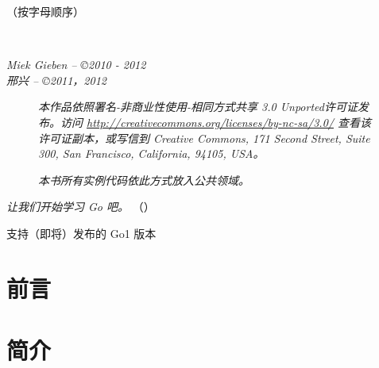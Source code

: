 \documentclass[a4paper,twoside,openleft]{blocksbook}
\begin{document}
\begin{cjk}
\begin{center}
（{\small 按字母顺序}）

\end{center}
\vfill
\begin{center}
    \hspace*{1cm}\\[2.5ex]
    \hspace*{1cm}{\tiny\CcNote{\CcLongnameByNcSa}}
\end{center}
\begin{center}
\hspace*{1cm}\emph{Miek Gieben -- \copyright 2010 - 2012} \\
\hspace*{1cm}\emph{邢兴 -- \copyright 2011，2012}
\end{center}
\vspace{-3em}

\newpage

\thispagestyle{empty}
\begin{figure}[H]
\begin{center}
\emph{
本作品依照署名-非商业性使用-相同方式共享 3.0 Unported许可证发布。访问 \url{http://creativecommons.org/licenses/by-nc-sa/3.0/} 查看该许可证副本，或写信到 Creative Commons, 171 Second Street, Suite 300, San Francisco, California, 94105, USA。}    
\vspace{2em}

\emph{本书所有实例代码依此方式放入公共领域。}
\end{center}
\end{figure}
\begin{center}
\vfill
\emph{让我们开始学习 Go 吧。}
（\emph{\version}）

\tiny{支持（即将）发布的 Go1 版本}
\vspace{.2\stockheight}
\end{center}

\clearpage

\tableofcontents*
\listoffigures*
\listofcode* 
\listofex* 
\clearpage

\chapter*{前言}
\label{chap:preface}


\chapter{简介}
\label{chap:intro}



\end{cjk}
\end{document}
